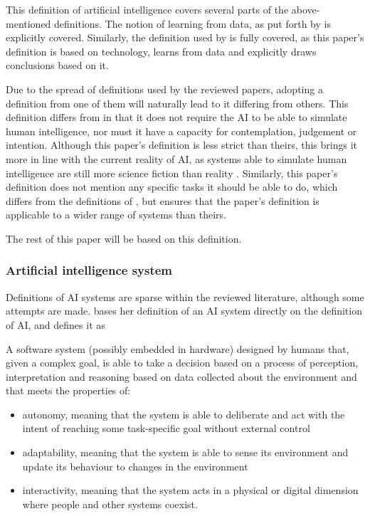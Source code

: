 This definition of artificial intelligence covers several parts of the above-mentioned definitions. The notion of learning from data, as put forth by \textcite{Mikalef_2022} is explicitly covered. Similarly, the definition used by \textcite{Dignum_2021} is fully covered, as this paper's definition is based on technology, learns from data and explicitly draws conclusions based on it.

Due to the spread of definitions used by the reviewed papers, adopting a definition from one of them will naturally lead to it differing from others. This definition differs from \textcite{Liu_2021,vanBruxvoort_2021} in that it does not require the AI to be able to simulate human intelligence, nor must it have a capacity for contemplation, judgement or intention. Although this paper's definition is less strict than theirs, this brings it more in line with the current reality of AI, as systems able to simulate human intelligence are still more science fiction than reality \parencite{Chen_2020}. Similarly, this paper's definition does not mention any specific tasks it should be able to do, which differs from the definitions of \textcite{Brand_2022,Havrda_2020}, but ensures that the paper's definition is applicable to a wider range of systems than theirs.

The rest of this paper will be based on this definition.


\subsubsection{Artificial intelligence system}
Definitions of AI systems are sparse within the reviewed literature, although some attempts are made. \textcite{Dignum_2021} bases her definition of an AI system directly on the definition of AI, and defines it as 
\begin{displayquote}
    A software system (possibly embedded in hardware) designed by humans that, given a complex goal, is able to take a decision based on a process of perception, interpretation and reasoning based on data collected about the environment and that meets the properties of: 
    \begin{itemize}
        \item autonomy, meaning that the system is able to deliberate and act with the intent of reaching some task-specific goal without external control 
        \item adaptability, meaning that the system is able to sense its environment and update its behaviour to changes in the environment 
        \item interactivity, meaning that the system acts in a physical or digital dimension where people and other systems coexist. \parencite[p.~2]{Dignum_2021}
    \end{itemize}
\end{displayquote}

